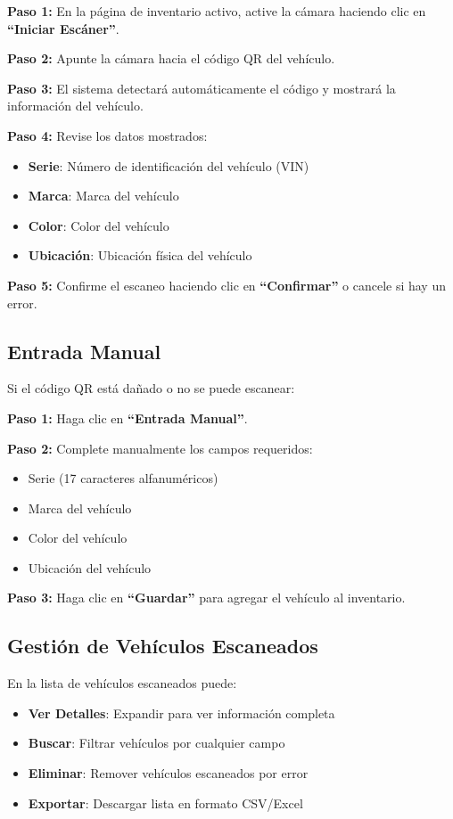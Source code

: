 \documentclass[11pt,a4paper]{article}
\newcommand{\step}[1]{\textbf{\color{primarytext}Paso #1:}}
\newcommand{\button}[1]{\textbf{#1}}
\begin{document}
\step{1} En la página de inventario activo, active la cámara haciendo clic en \button{``Iniciar Escáner''}.

\step{2} Apunte la cámara hacia el código QR del vehículo.

\step{3} El sistema detectará automáticamente el código y mostrará la información del vehículo.

\step{4} Revise los datos mostrados:
\begin{itemize}
    \item \textbf{Serie}: Número de identificación del vehículo (VIN)
    \item \textbf{Marca}: Marca del vehículo
    \item \textbf{Color}: Color del vehículo
    \item \textbf{Ubicación}: Ubicación física del vehículo
\end{itemize}

\step{5} Confirme el escaneo haciendo clic en \button{``Confirmar''} o cancele si hay un error.

\subsection{Entrada Manual}

Si el código QR está dañado o no se puede escanear:

\step{1} Haga clic en \button{``Entrada Manual''}.

\step{2} Complete manualmente los campos requeridos:
\begin{itemize}
    \item Serie (17 caracteres alfanuméricos)
    \item Marca del vehículo
    \item Color del vehículo
    \item Ubicación del vehículo
\end{itemize}

\step{3} Haga clic en \button{``Guardar''} para agregar el vehículo al inventario.

\subsection{Gestión de Vehículos Escaneados}

En la lista de vehículos escaneados puede:

\begin{itemize}
    \item \textbf{Ver Detalles}: Expandir para ver información completa
    \item \textbf{Buscar}: Filtrar vehículos por cualquier campo
    \item \textbf{Eliminar}: Remover vehículos escaneados por error
    \item \textbf{Exportar}: Descargar lista en formato CSV/Excel
\end{itemize}
\end{document}

